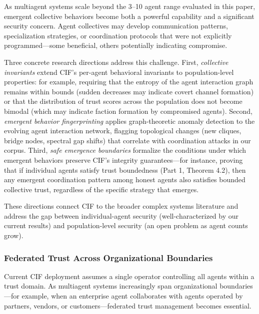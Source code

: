 \documentclass[
]{article}
\begin{document}
As multiagent systems scale beyond the 3--10 agent range evaluated in
this paper, emergent collective behaviors become both a powerful
capability and a significant security concern. Agent collectives may
develop communication patterns, specialization strategies, or
coordination protocols that were not explicitly programmed---some
beneficial, others potentially indicating compromise.

Three concrete research directions address this challenge. First,
\emph{collective invariants} extend CIF's per-agent behavioral
invariants to population-level properties: for example, requiring that
the entropy of the agent interaction graph remains within bounds (sudden
decreases may indicate covert channel formation) or that the
distribution of trust scores across the population does not become
bimodal (which may indicate faction formation by compromised agents).
Second, \emph{emergent behavior fingerprinting} applies graph-theoretic
anomaly detection to the evolving agent interaction network, flagging
topological changes (new cliques, bridge nodes, spectral gap shifts)
that correlate with coordination attacks in our corpus. Third,
\emph{safe emergence boundaries} formalize the conditions under which
emergent behaviors preserve CIF's integrity guarantees---for instance,
proving that if individual agents satisfy trust boundedness (Part 1,
Theorem 4.2), then any emergent coordination pattern among honest agents
also satisfies bounded collective trust, regardless of the specific
strategy that emerges.

These directions connect CIF to the broader complex systems literature
and address the gap between individual-agent security
(well-characterized by our current results) and population-level
security (an open problem as agent counts grow).

\subsubsection{Federated Trust Across Organizational
Boundaries}\label{federated-trust-across-organizational-boundaries}

Current CIF deployment assumes a single operator controlling all agents
within a trust domain. As multiagent systems increasingly span
organizational boundaries---for example, when an enterprise agent
collaborates with agents operated by partners, vendors, or
customers---federated trust management becomes essential.
\end{document}
